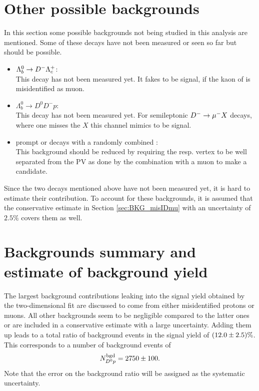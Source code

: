 \section{Other possible backgrounds}
In this section some possible backgrounds not being studied in this analysis are mentioned.
Some of these decays have not been measured or seen so far but should be possible.
\begin{itemize}
    \item $\Lambda_b^0 \rightarrow {\ensuremath{{D}^-}} {\ensuremath{{\Lambda}^+_{c}}}$: \\
          This decay has not been measured yet.
          It fakes to be signal, if the kaon of \LcTopKpi is misidentified as muon.
    \item $\Lambda_b^0 \rightarrow D^0 D^- p$: \\
          This decay has not been measured yet.
          For semileptonic ${{D}^-} \rightarrow {\ensuremath{\mu^-}} X$ decays, where one misses the $X$ this channel mimics to be \LbToDpmunuX signal.
    \item prompt \LcResI or \LcResII decays with a randomly combined \mun: \\
          This background should be reduced by requiring the \LcResI resp. \LcResII vertex to be well separated from the PV as done by the combination with a muon to make a \Lb candidate.
\end{itemize}
Since the two \Lb decays mentioned above have not been measured yet, it is hard to estimate their contribution.
To account for these backgrounds, it is assumed that the conservative estimate in Section \ref{sec:BKG_misIDmu} with an uncertainty of $2.5\%$ covers them as well.

\section{Backgrounds summary and estimate of background yield}
The largest background contributions leaking into the signal yield \NDp obtained by the two-dimensional fit are discussed to come from either misidentified protons or muons.
All other backgrounds seem to be negligible compared to the latter ones or are included in a conservative estimate with a large uncertainty.
Adding them up leads to a total ratio of background events in the signal yield of $(12.0 \pm 2.5)\%$.
This corresponds to a number of background events of 
\begin{align*}
    N^{\rm bgd}_{{{D}^0}{p}} = 2750 \pm 100.
\end{align*}
Note that the error on the background ratio will be assigned as the systematic uncertainty.
